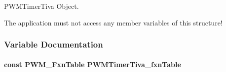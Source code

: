 P\+W\+M\+Timer\+Tiva Object. 

The application must not access any member variables of this structure! 

\subsubsection{Variable Documentation}
\paragraph[{P\+W\+M\+Timer\+Tiva\+\_\+fxn\+Table}]{\setlength{\rightskip}{0pt plus 5cm}const {\bf P\+W\+M\+\_\+\+Fxn\+Table} P\+W\+M\+Timer\+Tiva\+\_\+fxn\+Table}\label{_p_w_m_timer_tiva_8h_a9635643df3533a0642e7caa819c01a40}

